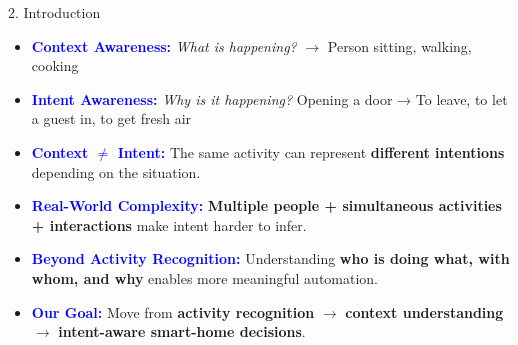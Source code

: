 \documentclass[aspectratio=169,11pt]{beamer}
\begin{document}

\begin{frame}{2. Introduction}

\begin{itemize}
    \setlength{\itemsep}{0.5em}

    \item \textcolor{blue}{\textbf{Context Awareness:}}
    \textit{What is happening?}
    $\rightarrow$ Person sitting, walking, cooking

    \item \textcolor{blue}{\textbf{Intent Awareness:}}
    \textit{Why is it happening?}
     Opening a door → To leave, to let a guest in, to get fresh air

    \item \textcolor{blue}{\textbf{Context $\neq$ Intent:}}
    The same activity can represent \textbf{different intentions}
    depending on the situation.

    \item \textcolor{blue}{\textbf{Real-World Complexity:}}
    \textbf{Multiple people + simultaneous activities + interactions}
    make intent harder to infer.

    \item \textcolor{blue}{\textbf{Beyond Activity Recognition:}}
    Understanding \textbf{who is doing what, with whom, and why}
    enables more meaningful automation.

    \item \textcolor{blue}{\textbf{Our Goal:}}
    Move from \textbf{activity recognition}
    $\rightarrow$ \textbf{context understanding}
    $\rightarrow$ \textbf{intent-aware smart-home decisions}.
\end{itemize}

\end{frame}
\end{document}

